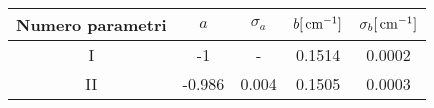 \begin{tabulary}{\textwidth}{CCCCC}
\toprule
Numero parametri & $a$  & $\sigma_a$ & $b [\,\mathrm{cm}^{-1}]$ & $\sigma_b [\,\mathrm{cm}^{-1}]$\\ \midrule
I & -1 & - & 0.1514 & 0.0002\\
II & -0.986 & 0.004 & 0.1505 & 0.0003\\
\bottomrule
\end{tabulary}

